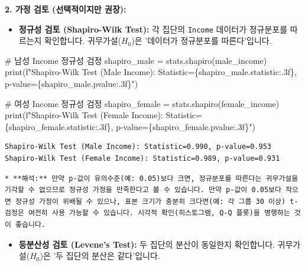 \documentclass[
  letterpaper,
]{book}
\newenvironment{Shaded}{\begin{snugshade}}{\end{snugshade}}
\newcommand{\BuiltInTok}[1]{\textcolor[rgb]{0.00,0.23,0.31}{#1}}
\newcommand{\CommentTok}[1]{\textcolor[rgb]{0.37,0.37,0.37}{#1}}
\newcommand{\NormalTok}[1]{\textcolor[rgb]{0.00,0.23,0.31}{#1}}
\newcommand{\OperatorTok}[1]{\textcolor[rgb]{0.37,0.37,0.37}{#1}}
\newcommand{\SpecialCharTok}[1]{\textcolor[rgb]{0.37,0.37,0.37}{#1}}
\newcommand{\SpecialStringTok}[1]{\textcolor[rgb]{0.13,0.47,0.30}{#1}}
\providecommand{\tightlist}{%
  \setlength{\itemsep}{0pt}\setlength{\parskip}{0pt}}
\begin{document}
\textbf{2. 가정 검토 (선택적이지만 권장):}

\begin{itemize}
\tightlist
\item
  \textbf{정규성 검토 (Shapiro-Wilk Test):} 각 집단의 \texttt{Income}
  데이터가 정규분포를 따르는지 확인합니다. 귀무가설(\(H_0\))은 '데이터가
  정규분포를 따른다'입니다.
\end{itemize}

\begin{Shaded}
\begin{Highlighting}[]
    \CommentTok{\# 남성 Income 정규성 검정}
\NormalTok{    shapiro\_male }\OperatorTok{=}\NormalTok{ stats.shapiro(male\_income)}
    \BuiltInTok{print}\NormalTok{(}\SpecialStringTok{f"Shapiro{-}Wilk Test (Male Income): Statistic=}\SpecialCharTok{\{}\NormalTok{shapiro\_male}\SpecialCharTok{.}\NormalTok{statistic}\SpecialCharTok{:.3f\}}\SpecialStringTok{, p{-}value=}\SpecialCharTok{\{}\NormalTok{shapiro\_male}\SpecialCharTok{.}\NormalTok{pvalue}\SpecialCharTok{:.3f\}}\SpecialStringTok{"}\NormalTok{)}

    \CommentTok{\# 여성 Income 정규성 검정}
\NormalTok{    shapiro\_female }\OperatorTok{=}\NormalTok{ stats.shapiro(female\_income)}
    \BuiltInTok{print}\NormalTok{(}\SpecialStringTok{f"Shapiro{-}Wilk Test (Female Income): Statistic=}\SpecialCharTok{\{}\NormalTok{shapiro\_female}\SpecialCharTok{.}\NormalTok{statistic}\SpecialCharTok{:.3f\}}\SpecialStringTok{, p{-}value=}\SpecialCharTok{\{}\NormalTok{shapiro\_female}\SpecialCharTok{.}\NormalTok{pvalue}\SpecialCharTok{:.3f\}}\SpecialStringTok{"}\NormalTok{)}
\end{Highlighting}
\end{Shaded}

\begin{verbatim}
Shapiro-Wilk Test (Male Income): Statistic=0.990, p-value=0.953
Shapiro-Wilk Test (Female Income): Statistic=0.989, p-value=0.931
\end{verbatim}

\begin{verbatim}
* **해석:** 만약 p-값이 유의수준(예: 0.05)보다 크면, 정규분포를 따른다는 귀무가설을 기각할 수 없으므로 정규성 가정을 만족한다고 볼 수 있습니다. 만약 p-값이 0.05보다 작으면 정규성 가정이 위배될 수 있으나, 표본 크기가 충분히 크다면(예: 각 그룹 30 이상) t-검정은 여전히 사용 가능할 수 있습니다. 시각적 확인(히스토그램, Q-Q 플롯)을 병행하는 것이 좋습니다.
\end{verbatim}

\begin{itemize}
\tightlist
\item
  \textbf{등분산성 검토 (Levene's Test):} 두 집단의 분산이 동일한지
  확인합니다. 귀무가설(\(H_0\))은 '두 집단의 분산은 같다'입니다.
\end{itemize}
\end{document}
